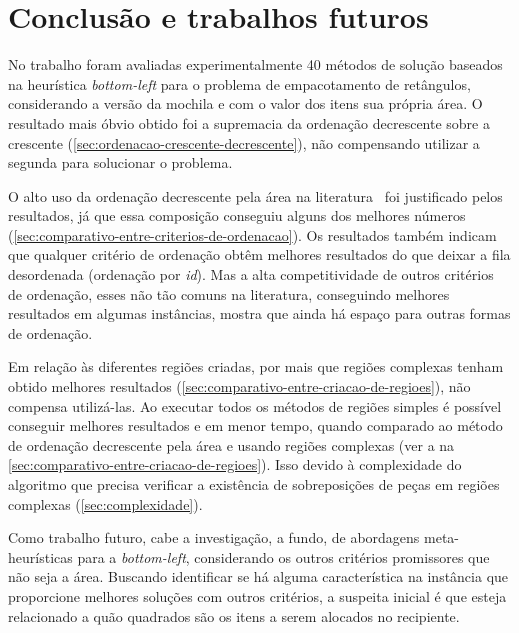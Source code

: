 \chapter*[Conclusão e trabalhos futuros]{Conclusão e trabalhos futuros}\label{ch:conclusao}

No trabalho foram avaliadas experimentalmente 40 métodos de solução baseados na heurística
\textit{bottom-left} para o problema de empacotamento de retângulos, considerando a versão da
mochila e com o valor dos itens sua própria área.
O resultado mais óbvio obtido foi a supremacia da ordenação decrescente sobre a crescente
(\cref{sec:ordenacao-crescente-decrescente}), não compensando utilizar a segunda para solucionar o
problema.

O alto uso da ordenação decrescente pela área na literatura~\cite{chen2019efficient} foi justificado
pelos resultados, já que essa composição conseguiu alguns dos melhores números
(\cref{sec:comparativo-entre-criterios-de-ordenacao}).
Os resultados também indicam que qualquer critério de ordenação obtêm melhores resultados do que
deixar a fila desordenada (ordenação por \textit{id}).
Mas a alta competitividade de outros critérios de ordenação, esses não tão comuns na literatura,
conseguindo melhores resultados em algumas instâncias, mostra que ainda há espaço para outras
formas de ordenação.

Em relação às diferentes regiões criadas, por mais que regiões complexas tenham obtido melhores
resultados (\cref{sec:comparativo-entre-criacao-de-regioes}), não compensa utilizá-las.
Ao executar todos os métodos de regiões simples é possível conseguir melhores resultados e em menor
tempo, quando comparado ao método de ordenação decrescente pela área e usando regiões complexas
(ver a  na \cref{sec:comparativo-entre-criacao-de-regioes}).
Isso devido à complexidade do algoritmo que precisa verificar a existência de sobreposições de peças
em regiões complexas (\cref{sec:complexidade}).

Como trabalho futuro, cabe a investigação, a fundo, de abordagens meta-heurísticas para a
\textit{bottom-left}, considerando os outros critérios promissores que não seja a área.
Buscando identificar se há alguma característica na instância que proporcione melhores soluções com
outros critérios, a suspeita inicial é que esteja relacionado a quão quadrados são os itens a serem
alocados no recipiente.

